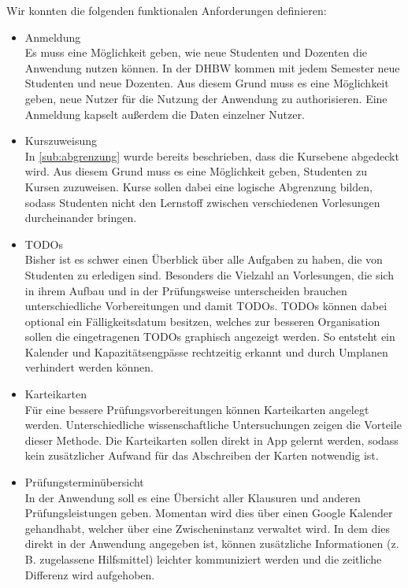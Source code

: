 Wir konnten die folgenden funktionalen Anforderungen definieren:
\begin{itemize}
    \item Anmeldung                         \\
        Es muss eine Möglichkeit geben, wie neue Studenten und Dozenten die Anwendung nutzen können.
        In der DHBW kommen mit jedem Semester neue Studenten und neue Dozenten.
        Aus diesem Grund muss es eine Möglichkeit geben, neue Nutzer für die Nutzung der Anwendung zu authorisieren.
        Eine Anmeldung kapselt außerdem die Daten einzelner Nutzer.
    \item Kurszuweisung                     \\
        In \autoref{sub:abgrenzung} wurde bereits beschrieben, dass die Kursebene abgedeckt wird.
        Aus diesem Grund muss es eine Möglichkeit geben, Studenten zu Kursen zuzuweisen.
        Kurse sollen dabei eine logische Abgrenzung bilden, sodass Studenten nicht den Lernstoff zwischen verschiedenen Vorlesungen durcheinander bringen.
    \item TODOs                             \\
        Bisher ist es schwer einen Überblick über alle Aufgaben zu haben, die von Studenten zu erledigen sind.
        Besonders die Vielzahl an Vorlesungen, die sich in ihrem Aufbau und in der Prüfungsweise unterscheiden brauchen unterschiedliche Vorbereitungen und damit TODOs.
        TODOs können dabei optional ein Fälligkeitsdatum besitzen, welches zur besseren Organisation sollen die eingetragenen TODOs graphisch angezeigt werden.
        So entsteht ein Kalender und Kapazitätsengpässe rechtzeitig erkannt und durch Umplanen verhindert werden können.
    \item Karteikarten                      \\
        Für eine bessere Prüfungsvorbereitungen können Karteikarten angelegt werden. Unterschiedliche wissenschaftliche Untersuchungen zeigen die Vorteile dieser Methode. Die Karteikarten sollen direkt in App gelernt werden, sodass kein zusätzlicher Aufwand für das Abschreiben der Karten notwendig ist.

    \item Prüfungsterminübersicht           \\
        In der Anwendung soll es eine Übersicht aller Klausuren und anderen Prüfungsleistungen geben.
        Momentan wird dies über einen Google Kalender gehandhabt, welcher über eine Zwischeninstanz verwaltet wird.
        In dem dies direkt in der Anwendung angegeben ist, können zusätzliche Informationen (z.\,B. zugelassene Hilfsmittel) leichter kommuniziert werden und die zeitliche Differenz wird aufgehoben.


\end{itemize}
